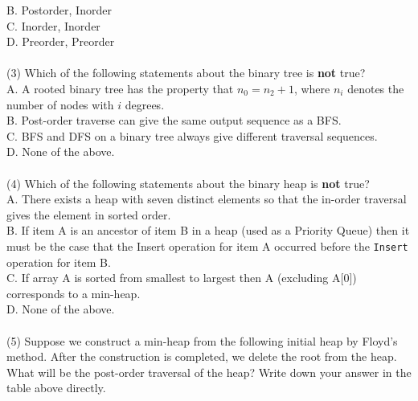 \documentclass{article}
\begin{document}
B. Postorder, Inorder \\
C. Inorder, Inorder \\
D. Preorder, Preorder \\
~\\
(3) Which of the following statements about the binary tree is \textbf{not} true? \\
A. A rooted binary tree has the property that $n_{0} = n_{2} + 1$, where $n_{i}$ denotes the number of nodes with $i$ degrees.\\
B. Post-order traverse can give the same output sequence as a BFS.\\
C. BFS and DFS on a binary tree always give different traversal sequences.\\
D. None of the above.\\
~\\
(4) Which of the following statements about the binary heap is \textbf{not} true? \\
A. There exists a heap with seven distinct elements so that the in-order traversal gives the element in sorted order. \\
B. If item A is an ancestor of item B in a heap (used as a Priority Queue) then it must be the case that the Insert operation for item A occurred before the \texttt{Insert} operation for item B.\\
C. If array A is sorted from smallest to largest then A (excluding A[0]) corresponds to a min-heap. \\
D. None of the above. \\
~\\
(5) Suppose we construct a min-heap from the following initial heap by Floyd's method. After the construction is completed, we delete the root from the heap. What will be the post-order traversal of the heap? Write down your answer in the table above directly.\\
~\\
\begin{minipage}{1\textwidth}
	\centering
\end{minipage}%
\newpage
\end{document}
